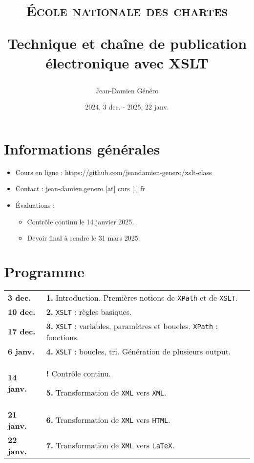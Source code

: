 \documentclass[a4paper]{article}
\title{\textsc{École nationale des chartes}

\bigskip

Technique et chaîne de publication électronique avec XSLT}
\author{Jean-Damien Généro}
\date{2024, 3 dec. - 2025, 22 janv.}
\begin{document}
\maketitle

\section*{Informations générales}

\begin{itemize}
    \item Cours en ligne : https://github.com/jeandamien-genero/xslt-class
    \item Contact : jean-damien.genero [at] cnrs [.] fr
    \item Évaluations :
    \begin{itemize}
        \item Contrôle continu le 14 janvier 2025.
        \item Devoir final à rendre le 31 mars 2025.
    \end{itemize}
\end{itemize}

\bigskip

\section*{Programme}

\renewcommand{\arraystretch}{1.5}
\begin{center}
    \begin{tabular}[h]{|p{1.5cm} p{9.6cm}}
        \textbf{3 dec.} & \textbf{1.} Introduction. Premières notions de \texttt{XPath} et de \texttt{XSLT}.\\
        \textbf{10 dec.} & \textbf{2.} \texttt{XSLT} : règles basiques.  \\
        \textbf{17 dec.} & \textbf{3.} \texttt{XSLT} : variables, paramètres et boucles. \texttt{XPath} : fonctions. \\
        \textbf{6 janv.} & \textbf{4.} \texttt{XSLT} :  boucles, tri. Génération de plusieurs output. \\
        \textbf{14 janv.} & \textbf{!}  Contrôle continu.
        
        \textbf{5.} Transformation de \texttt{XML}  vers \texttt{XML}. \\
        \textbf{21 janv.} & \textbf{6.} Transformation de \texttt{XML}  vers \texttt{HTML}. \\
        \textbf{22 janv.} & \textbf{7.} Transformation de \texttt{XML}  vers \texttt{LaTeX}. \\
    \end{tabular}
\end{center}
\end{document}
